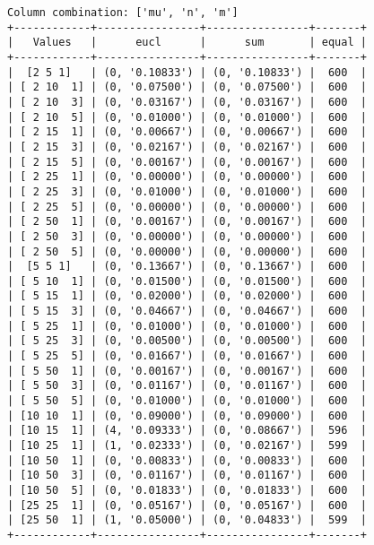 \documentclass{article}
\begin{document}
\begin{verbatim}
Column combination: ['mu', 'n', 'm']
+------------+----------------+----------------+-------+
|   Values   |      eucl      |      sum       | equal |
+------------+----------------+----------------+-------+
|  [2 5 1]   | (0, '0.10833') | (0, '0.10833') |  600  |
| [ 2 10  1] | (0, '0.07500') | (0, '0.07500') |  600  |
| [ 2 10  3] | (0, '0.03167') | (0, '0.03167') |  600  |
| [ 2 10  5] | (0, '0.01000') | (0, '0.01000') |  600  |
| [ 2 15  1] | (0, '0.00667') | (0, '0.00667') |  600  |
| [ 2 15  3] | (0, '0.02167') | (0, '0.02167') |  600  |
| [ 2 15  5] | (0, '0.00167') | (0, '0.00167') |  600  |
| [ 2 25  1] | (0, '0.00000') | (0, '0.00000') |  600  |
| [ 2 25  3] | (0, '0.01000') | (0, '0.01000') |  600  |
| [ 2 25  5] | (0, '0.00000') | (0, '0.00000') |  600  |
| [ 2 50  1] | (0, '0.00167') | (0, '0.00167') |  600  |
| [ 2 50  3] | (0, '0.00000') | (0, '0.00000') |  600  |
| [ 2 50  5] | (0, '0.00000') | (0, '0.00000') |  600  |
|  [5 5 1]   | (0, '0.13667') | (0, '0.13667') |  600  |
| [ 5 10  1] | (0, '0.01500') | (0, '0.01500') |  600  |
| [ 5 15  1] | (0, '0.02000') | (0, '0.02000') |  600  |
| [ 5 15  3] | (0, '0.04667') | (0, '0.04667') |  600  |
| [ 5 25  1] | (0, '0.01000') | (0, '0.01000') |  600  |
| [ 5 25  3] | (0, '0.00500') | (0, '0.00500') |  600  |
| [ 5 25  5] | (0, '0.01667') | (0, '0.01667') |  600  |
| [ 5 50  1] | (0, '0.00167') | (0, '0.00167') |  600  |
| [ 5 50  3] | (0, '0.01167') | (0, '0.01167') |  600  |
| [ 5 50  5] | (0, '0.01000') | (0, '0.01000') |  600  |
| [10 10  1] | (0, '0.09000') | (0, '0.09000') |  600  |
| [10 15  1] | (4, '0.09333') | (0, '0.08667') |  596  |
| [10 25  1] | (1, '0.02333') | (0, '0.02167') |  599  |
| [10 50  1] | (0, '0.00833') | (0, '0.00833') |  600  |
| [10 50  3] | (0, '0.01167') | (0, '0.01167') |  600  |
| [10 50  5] | (0, '0.01833') | (0, '0.01833') |  600  |
| [25 25  1] | (0, '0.05167') | (0, '0.05167') |  600  |
| [25 50  1] | (1, '0.05000') | (0, '0.04833') |  599  |
+------------+----------------+----------------+-------+
\end{verbatim}
\end{document}
